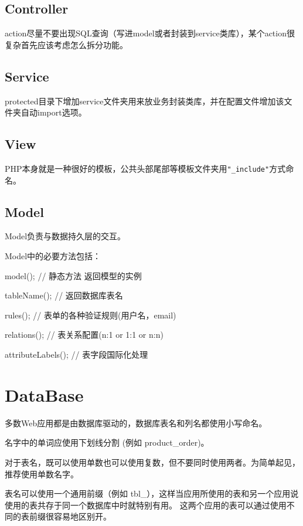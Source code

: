 \subsection{Controller}

action尽量不要出现SQL查询（写进model或者封装到service类库），某个action很复杂首先应该考虑怎么拆分功能。

\subsection{Service}


protected目录下增加service文件夹用来放业务封装类库，并在配置文件增加该文件夹自动import选项。


\subsection{View}

PHP本身就是一种很好的模板，公共头部尾部等模板文件夹用\texttt{"\_include"}方式命名。


\subsection{Model}


Model负责与数据持久层的交互。

Model中的必要方法包括：

\begin{compactitem}
\item model();      // 静态方法 返回模型的实例 
\item tableName(); // 返回数据库表名 
\item rules();      // 表单的各种验证规则(用户名，email) 
\item relations();  // 表关系配置(n:1 or 1:1 or n:n) 
\item attributeLabels();  // 表字段国际化处理
\end{compactitem}

\section{DataBase}

多数Web应用都是由数据库驱动的，数据库表名和列名都使用小写命名。


名字中的单词应使用下划线分割 (例如 product\_order)。


对于表名，既可以使用单数也可以使用复数，但不要同时使用两者。为简单起见，推荐使用单数名字。

表名可以使用一个通用前缀（例如 tbl\_），这样当应用所使用的表和另一个应用说使用的表共存于同一个数据库中时就特别有用。 这两个应用的表可以通过使用不同的表前缀很容易地区别开。 

